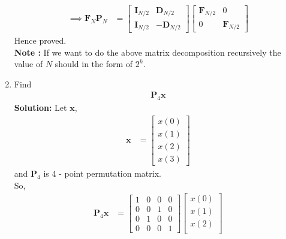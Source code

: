 \documentclass[journal,12pt,twocolumn]{IEEEtran}
\newcommand{\solution}{\noindent \textbf{Solution: }}
\let\vec\mathbf
\numberwithin{equation}{section}
\renewcommand\thesection{\arabic{section}}
\begin{document}
\begin{enumerate}[label=\arabic*.,ref=\thesection.\theenumi]
\begin{align}
    \implies 	\vec{F}_{N}\vec{P}_{N} &= \begin{bmatrix}
                                          	\vec{I}_{N/2} & \vec{D}_{N/2} \\
    	                                    \vec{I}_{N/2} & \vec{-D}_{N/2}
                                          \end{bmatrix}
                                         \begin{bmatrix}
    	                                  \vec{F}_{N/2} &  0 \\
                                              	0       & \vec{F}_{N/2}
                                         \end{bmatrix}
  \end{align}  
Hence proved.\\
\textbf{Note :} If we want to do the above matrix decomposition recursively the value of $N$ should in the form of $2^{k}$.
          \item Find 
    \begin{align}
	     \vec{P}_4 \vec{x}
    \end{align}
\solution Let $\vec{x}$,
       \begin{align}
       	\vec{x} &= \begin{bmatrix}
       		        x(0) \\ 
       	         	x(1) \\ 
       		        x(2) \\ 
       		        x(3)
       	           \end{bmatrix}
       \end{align}
     and $\vec{P}_4$ is 4 - point permutation matrix.\\
    So,
    \begin{align}
    	\vec{P}_{4}\vec{x} &= \begin{bmatrix}
                               1 & 0 & 0 & 0 \\
                               0 & 0 & 1 & 0 \\
                               0 & 1 & 0 & 0 \\
                               0 & 0 & 0 & 1   		
     	                      \end{bmatrix}
                              \begin{bmatrix}
                              	x(0) \\ 
                              	x(1) \\ 
                              	x(2) \\ 

\end{bmatrix}
\end{align}
\end{enumerate}
\end{document}
